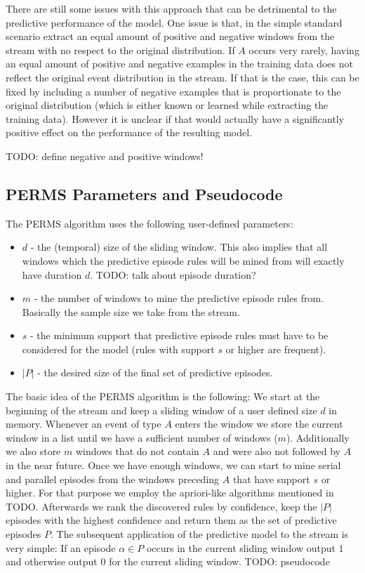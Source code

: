 There are still some issues with this approach that can be detrimental to the predictive performance of the model. One issue is that, in the simple standard scenario extract an equal amount of positive and negative windows from the stream with no respect to the original distribution. If $A$ occurs very rarely, having an equal amount of positive and negative examples in the training data does not reflect the original event distribution in the stream. If that is the case, this can be fixed by including a number of negative examples that is proportionate to the original distribution (which is either known or learned while extracting the training data). However it is unclear if that would actually have a significantly positive effect on the performance of the resulting model.



TODO: define negative and positive windows!




\subsection{PERMS Parameters and Pseudocode}

The PERMS algorithm uses the following user-defined parameters:

\begin{itemize}
	\item \textbf{$d$} - the (temporal) size of the sliding window. This also implies that all windows which the predictive episode rules will be mined from will exactly have duration $d$. TODO: talk about episode duration?	
	\item \textbf{$m$} - the number of windows to mine the predictive episode rules from. Basically the sample size we take from the stream.
	\item \textbf{$s$} - the minimum support that predictive episode rules must have to be considered for the model (rules with support $s$ or higher are frequent).
	\item \textbf{$|P|$} - the desired size of the final set of predictive episodes.
\end{itemize}


The basic idea of the PERMS algorithm is the following:
We start at the beginning of the stream and keep a sliding window of a user defined size $d$ in memory. Whenever an event of type $A$ enters the window we store the current window in a list until we have a sufficient number of windows ($m$). Additionally we also store $m$ windows that do not contain $A$ and were also not followed by $A$ in the near future. Once we have enough windows, we can start to mine serial and parallel episodes from the windows preceding $A$ that have support $s$ or higher. For that purpose we employ the apriori-like algorithms mentioned in TODO. Afterwards we rank the discovered rules by confidence, keep the $|P|$ episodes with the highest confidence and return them as the set of predictive episodes $P$.
The subsequent application of the predictive model to the stream is very simple: If an episode $\alpha \in P$ occurs in the current sliding window output $1$ and otherwise output $0$ for the current sliding window.
TODO: pseudocode


